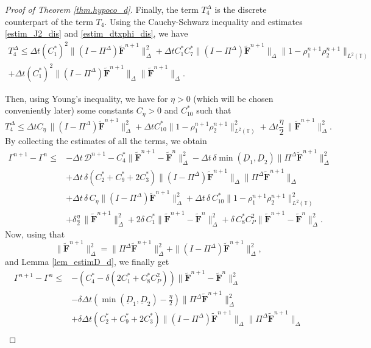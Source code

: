 \documentclass[reqno]{amsart}
\newcommand{\T}{\mathbb{T}}
\newcommand{\Ft}{{\widetilde{F}}}
\newcommand{\Ftbf}{\mathbf{\Ft}}
\numberwithin{equation}{section}
\begin{document}
\begin{proof}[Proof of Theorem \ref{thm.hypoco_d}]
    Finally, the term $T_{4}^\Delta$ is the discrete counterpart of the term $T_4$. Using the Cauchy-Schwarz inequality and estimates \eqref{estim_J2_dis} and \eqref{estim_dtxphi_dis}, we have
    \begin{gather*}
        T_{4}^\Delta\leq \Delta t(C_1^*)^2\|(I-\Pi^\Delta)\Ftbf^{n+1}\|_\Delta^2+\Delta t C_1^*C_7^*\|(I-\Pi^\Delta)\Ftbf^{n+1}\|_\Delta\|1-\rho_1^{n+1}\rho_2^{n+1}\|_{L^2(\T)}\\
        + \Delta t (C_1^*)^2\|(I-\Pi^\Delta)\Ftbf^{n+1}\|_{\Delta}\|\Ftbf^{n+1}\|_\Delta.
    \end{gather*}
    
    Then, using Young's inequality, we have for $\eta>0$ (which will be chosen conveniently later) some constants $C_\eta>0$ and $C_{10}^*$ such that
    \[
    T_{4}^\Delta\leq \Delta t C_\eta\,\|(I-\Pi^\Delta)\Ftbf^{n+1}\|_\Delta^2+\Delta t C_{10}^*\|1-\rho_1^{n+1}\rho_2^{n+1}\|_{L^2(\T)}^2+\Delta t\frac{\eta}{2}\,\|\Ftbf^{n+1}\|_\Delta^2.
    \]
    By collecting the estimates of all the terms, we obtain
    \begin{align*}
        \Gamma^{n+1}-\Gamma^n\leq &-\Delta t\,\mathcal{D}^{n+1}-C^*_{4}\|\Ftbf^{n+1}-\Ftbf^n\|_\Delta^2-\Delta t\,\delta\min (\underbar{D}_1,\underbar{D}_2)\|\Pi^\Delta\Ftbf^{n+1}\|^2_\Delta\\
        & +\Delta t\,\delta(C_2^*+C_9^*+2C_{3}^*)\|(I-\Pi^\Delta)\Ftbf^{n+1}\|_\Delta\|\Pi^\Delta\Ftbf^{n+1}\|_\Delta\\
        & + \Delta t\,\delta\,C_\eta\|(I-\Pi^\Delta)\Ftbf^{n+1}\|_\Delta^2+\Delta t\,\delta\,C_{10}^*\|1-\rho_1^{n+1}\rho_2^{n+1}\|_{L^2(\T)}^2\\
        &+\delta\frac{\eta}{2}\,\|\Ftbf^{n+1}\|_\Delta^2+2\delta\, C_1^*\|\Ftbf^{n+1}-\Ftbf^n\|_\Delta^2+\delta\,C_{8}^*C_P^2\|\Ftbf^{n+1}-\Ftbf^n\|_\Delta^2.
    \end{align*}
    Now, using that 
    \[
    \|\Ftbf^{n+1}\|^2_\Delta=\|\Pi^\Delta\Ftbf^{n+1}\|_\Delta^2+\|(I-\Pi^\Delta)\Ftbf^{n+1}\|_\Delta^2,
    \]
    and Lemma \ref{lem_estimD_d},  we finally get
    \begin{align*}
        \Gamma^{n+1}-\Gamma^n\leq & -\left(C^*_{4}-\delta(2 C_1^*+C_{8}^*C_P^2)\right)\|\Ftbf^{n+1}-\Ftbf^n\|_\Delta^2\\
        & -\delta\Delta t\left(\min(\underbar{D}_1,\underbar{D}_2)-\frac{\eta}{2}\right)\|\Pi^\Delta\Ftbf^{n+1}\|_\Delta^2\\
        &+\delta\Delta t\left(C_2^*+C_9^*+2C_{3}^*\right)\|(I-\Pi^\Delta)\Ftbf^{n+1}\|_\Delta\|\Pi^\Delta\Ftbf^{n+1}\|_\Delta\\

\end{align*}
\end{proof}
\end{document}
